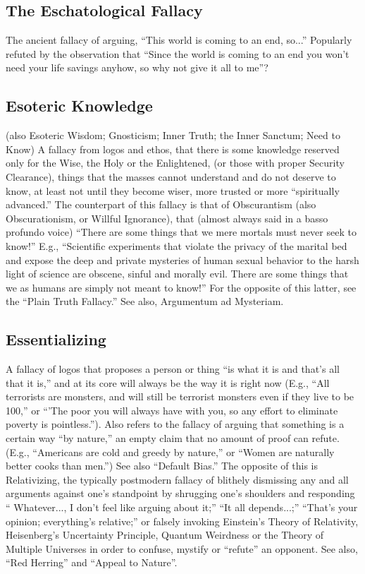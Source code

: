 \documentclass[10pt,a4paper,british]{article}
\begin{document}
\begin{multicols}{2}
    \subsection{The Eschatological Fallacy} The ancient fallacy of arguing,
    ``This world is coming to an end, so...''  Popularly refuted by the
    observation that ``Since the world is coming to an end you won't need your
    life savings anyhow, so why not give it all to me''?

	\subsection{Esoteric Knowledge} (also Esoteric Wisdom; Gnosticism; Inner
	Truth; the Inner Sanctum; Need to Know) A fallacy from logos and ethos,
	that there is some knowledge reserved only for the Wise, the Holy or the
	Enlightened, (or those with proper Security Clearance), things that the
	masses cannot understand and do not deserve to know, at least not until
	they become wiser, more trusted or more ``spiritually advanced.''  The
	counterpart of this fallacy is that of Obscurantism (also Obscurationism,
	or Willful Ignorance), that (almost always said in a basso profundo voice)
	``There are some things that we mere mortals must never seek to know!''
	E.g., ``Scientific experiments that violate the privacy of the marital bed
	and expose  the deep and private mysteries of human sexual behavior to the
	harsh light of science are obscene, sinful and morally evil. There are some
	things that we as humans are simply not meant to know!'' For the opposite
	of this latter, see the ``Plain Truth Fallacy.'' See also, Argumentum ad
	Mysteriam.

    \subsection{Essentializing} A fallacy of logos that proposes a person or
    thing “is what it is and that’s all that it is,” and at its core will
    always be the way it is right now (E.g., ``All terrorists are monsters, and
    will still be terrorist monsters even if they live to be 100,'' or ``'The
    poor you will always have with you, so any effort to eliminate poverty is
    pointless.''). Also refers to the fallacy of arguing that something is a
    certain way ``by nature,'' an empty claim that no amount of proof can
    refute. (E.g., ``Americans are cold and greedy by nature,'' or ``Women are
    naturally better cooks than men.'') See also ``Default Bias.''  The
    opposite of this is Relativizing, the typically postmodern fallacy of
    blithely dismissing any and all arguments against one's standpoint by
    shrugging one's shoulders and responding `` Whatever..., I don't feel like
    arguing about it;'' ``It all depends...;'' ``That's your opinion;
    everything's relative;'' or falsely invoking Einstein's Theory of
    Relativity, Heisenberg's Uncertainty Principle, Quantum Weirdness or the
    Theory of Multiple Universes in order to confuse, mystify or ``refute'' an
    opponent. See also, ``Red Herring'' and  ``Appeal to Nature''.


\end{multicols}
\end{document}
